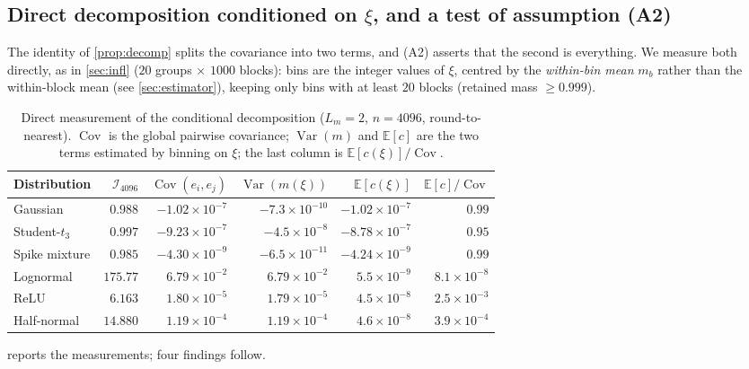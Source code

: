 \documentclass[review,hidelinks,oneeqnum,onetabnum,onefignum,onethmnum]{siamart251216}
\begin{document}
\subsection{Direct decomposition conditioned on $\xi$, and a test of
assumption (A2)}
\label{sec:cond}

The identity of \cref{prop:decomp} splits the covariance into two terms, and
(A2) asserts that the second is everything. We measure both directly, as in
\cref{sec:infl} ($20$ groups $\times$ $1000$ blocks): bins are the integer values
of $\xi$, centred by the \emph{within-bin mean} $m_b$ rather than the within-block
mean (see \cref{sec:estimator}), keeping only bins with at least $20$ blocks
(retained mass $\ge0.999$).

\begin{table}[!tb]
\centering
\caption{Direct measurement of the conditional decomposition ($L_m=2$,
$n=4096$, round-to-nearest). $\operatorname{Cov}$ is the global pairwise
covariance; $\operatorname{Var}(m)$ and $\mathbb{E}[c]$ are the two terms
estimated by binning on $\xi$; the last column is
$\mathbb{E}[c(\xi)]/\operatorname{Cov}$.}
\label{tab:cond}
\footnotesize
\begin{tabular}{@{}lrrrrr@{}}
\toprule
Distribution & $\mathcal I_{4096}$ & $\operatorname{Cov}(e_i,e_j)$ & $\operatorname{Var}(m(\xi))$ & $\mathbb{E}[c(\xi)]$ & $\mathbb{E}[c]/\operatorname{Cov}$ \\
\midrule
Gaussian      & $0.988$  & $-1.02\times10^{-7}$ & $-7.3\times10^{-10}$ & $-1.02\times10^{-7}$ & $0.99$ \\
Student-$t_3$ & $0.997$  & $-9.23\times10^{-7}$ & $-4.5\times10^{-8}$  & $-8.78\times10^{-7}$ & $0.95$ \\
Spike mixture & $0.985$  & $-4.30\times10^{-9}$ & $-6.5\times10^{-11}$ & $-4.24\times10^{-9}$ & $0.99$ \\
\midrule
Lognormal     & $\mathbf{175.77}$ & $6.79\times10^{-2}$ & $6.79\times10^{-2}$ & $5.5\times10^{-9}$ & $8.1\times10^{-8}$ \\
ReLU          & $\mathbf{6.163}$  & $1.80\times10^{-5}$ & $1.79\times10^{-5}$ & $4.5\times10^{-8}$ & $2.5\times10^{-3}$ \\
Half-normal   & $\mathbf{14.880}$ & $1.19\times10^{-4}$ & $1.19\times10^{-4}$ & $4.6\times10^{-8}$ & $3.9\times10^{-4}$ \\
\bottomrule
\end{tabular}
\end{table}

 reports the measurements; four findings follow.
\end{document}
